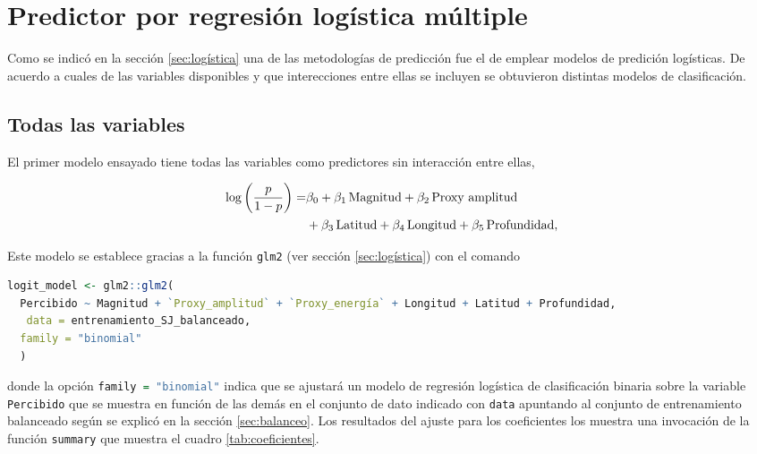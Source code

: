 \documentclass[a4paper]{report}
\begin{document}


\section{Predictor por regresión logística múltiple}

Como se indicó en la sección \ref{sec:logística} una de las metodologías de predicción fue el de emplear modelos de predición logísticas.
De acuerdo a cuales de las variables disponibles y que interecciones entre ellas  se incluyen se obtuvieron distintas modelos de clasificación.


\subsection{Todas las variables}\label{sec:logística_sin_interacción}

El primer modelo ensayado tiene todas las variables como predictores sin interacción entre ellas,

\begin{align}
	\log \left( \frac{p}{1-p} \right) = & \beta_0 
	+ \beta_1\, \text{Magnitud} 
	+ \beta_2 \, \text{Proxy amplitud}\notag\\
	& + \beta_3 \, \text{Latitud} 
	+ \beta_4 \, \text{Longitud} 
	+ \beta_5 \, \text{Profundidad} 
	,
	\label{eq:regresion_logistica}
\end{align}

Este modelo se establece gracias a la función \lstinline[language = R]'glm2' (ver sección \ref{sec:logística}) con el comando
\begin{lstlisting}[language=R, breaklines=true]
logit_model <- glm2::glm2(
  Percibido ~ Magnitud + `Proxy_amplitud` + `Proxy_energía` + Longitud + Latitud + Profundidad,
   data = entrenamiento_SJ_balanceado,
  family = "binomial"
  )
\end{lstlisting}
donde la opción \lstinline[language = R]'family = "binomial"' indica que se ajustará un modelo de regresión logística de clasificación binaria sobre la variable \lstinline[language=R]|Percibido| que se muestra en función de las demás en el conjunto de dato indicado con \lstinline[language=R]|data| apuntando al conjunto de entrenamiento balanceado según se explicó en la sección \ref{sec:balanceo}.
Los resultados del ajuste para los coeficientes los muestra una invocación de la función \lstinline[language = R]'summary' que muestra el cuadro \ref{tab:coeficientes}. 
\end{document}
